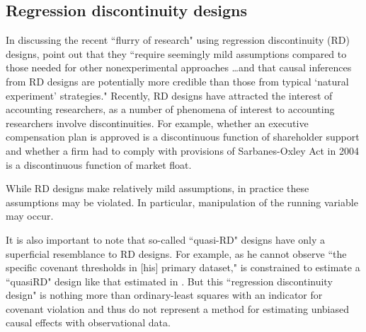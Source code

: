 \documentclass[11pt]{amsart}
\begin{document}

\subsection{Regression discontinuity designs} 

In discussing the recent ``flurry of research" using regression discontinuity (RD) designs, \citet[p.282]{Lee:2010hya} point out that they ``require seemingly mild assumptions compared to those needed for other nonexperimental approaches \dots and that causal inferences from RD designs are potentially more credible than those from typical `natural experiment' strategies." 
Recently, RD designs have attracted the interest of accounting researchers, as a number of phenomena of interest to accounting researchers involve discontinuities. For example, whether an executive compensation plan is approved is a discontinuous function of shareholder support \citet{Armstrong:2013io} and whether a firm had to comply with provisions of Sarbanes-Oxley Act in 2004 \citep{Iliev:2010ic} is a discontinuous function of market float.

While RD designs make relatively mild assumptions, in practice these assumptions may be violated.
In particular, manipulation of the running variable may occur.

It is also important to note that so-called ``quasi-RD" designs have only a superficial resemblance to RD designs.
For example, as he cannot observe ``the specific covenant thresholds in [his] primary dataset," \citet{Tan:2013ce} is constrained to estimate a ``quasiRD" design like that estimated in \citep{Roberts:2009ka}.
But this ``regression discontinuity design"  is nothing more than ordinary-least squares with an indicator for covenant violation and thus do not represent a method for estimating unbiased causal effects with observational data.
\end{document}
